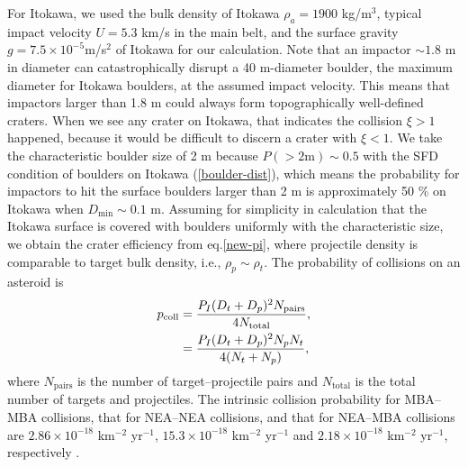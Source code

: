 \documentclass[3p,authoryear]{elsarticle}
\begin{document}
For Itokawa, we used the bulk density of Itokawa $\rho_a=1900$ kg/m$^3$, typical impact velocity $U=5.3$ km/s in the main belt, and the surface gravity $g=7.5\times 10^{-5}$m/s$^2$ of Itokawa for our calculation.
Note that an impactor $\sim 1.8$ m in diameter can catastrophically disrupt a 40 m-diameter boulder, the maximum diameter for Itokawa boulders, at the assumed impact velocity.
This means that impactors larger than 1.8 m could always form topographically well-defined craters.
When we see any crater on Itokawa, that indicates the collision $\xi>1$ happened, because it would be difficult to discern a crater with $\xi<1$.
We take the characteristic boulder size of 2 m because $P(>2 \text{m})\sim 0.5$ with the SFD condition of boulders on Itokawa (\ref{boulder-dist}), which means the probability for impactors to hit the surface boulders larger than 2 m is approximately 50 \% on Itokawa when $D_\text{min} \sim 0.1$ m.
Assuming for simplicity in calculation that the Itokawa surface is covered with boulders uniformly with the characteristic size, we obtain the crater efficiency from eq.\eqref{new-pi},
where projectile density is comparable to target bulk density, i.e., $\rho_p\sim\rho_t$.
%
%
The probability of collisions on an asteroid is
\begin{align}
	p_\text{coll}&=\frac{P_I(D_t+D_p)^2N_\text{pairs}}{4 N_\text{total}}, \notag\\
	&=\frac{P_I(D_t+D_p)^2N_pN_t}{4(N_t+N_p)},
\end{align}
where $N_\text{pairs}$ is the number of target--projectile pairs and $N_\text{total}$ is the total number of targets and projectiles.
The intrinsic collision probability for MBA--MBA collisions, that for NEA--NEA collisions, and that for NEA--MBA collisions are $2.86\times 10^{-18}$ km$^{-2}$ yr$^{-1}$, $15.3\times 10^{-18}$ km$^{-2}$ yr$^{-1}$ and $2.18\times 10^{-18}$ km$^{-2}$ yr$^{-1}$, respectively \citep{bottke1994}.
\end{document}
